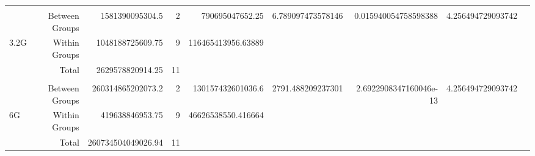 \begin{landscape}
\begin{table}[!htp]
\begin{tabular}{lrrrrrrrr}
& & & & & & & \\
&Between Groups &1581390095304.5 &2 &790695047652.25 &6.789097473578146 &0.015940054758598388 &4.256494729093742 \\
3.2G &Within Groups &1048188725609.75 &9 &116465413956.63889 & & & \\
&Total &2629578820914.25 &11 & & & & \\
& & & & & & & \\
&Between Groups &260314865202073.2 &2 &130157432601036.6 &2791.488209237301 &2.6922908347160046e-13 &4.256494729093742 \\
6G &Within Groups &419638846953.75 &9 &46626538550.416664 & & & \\
&Total &260734504049026.94 &11 & & & & \\
\bottomrule
\end{tabular}
\end{table}
\end{landscape}


